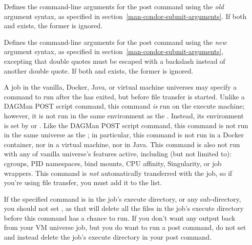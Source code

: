 \begin{description}
\item[\AdAttr{PostArgs}:] Defines the command-line arguments for the
post command using the \emph{old} argument syntax, as specified in
section~\ref{man-condor-submit-arguments}. If both 
and  exists, the former is ignored.

\item[\AdAttr{PostArguments}:] Defines the command-line arguments for the
post command using the \emph{new} argument syntax, as specified in
section~\ref{man-condor-submit-arguments}, excepting that double quotes must
be escaped with a backslash instead of another double quote. If both
 and  exists, the former is ignored.

\label{PostCmd}
\item[\AdAttr{PostCmd}:] A job in the vanilla, Docker, Java, or virtual machine
universes may specify a command to run after the  has
exited, but before file transfer is started.  Unlike a DAGMan POST script
command, this command \emph{is} run on the execute machine; however, it
is not run in the same environment as the .  Instead,
its environment is set by  or .  Like
the DAGMan POST script command, this command is not run in the same universe
as the ; in particular, this command is not run in a
Docker container, nor in a virtual machine, nor in Java.  This command is
also not run with any of vanilla universe's features active, including (but
not limited to): cgroups, PID namespaces, bind mounts, CPU affinity,
Singularity, or job wrappers. This command is \emph{not}
automatically transferred with the job, so if you're using file transfer,
you must add it to the  list.

If the specified command is in the job's execute directory, or any
sub-directory, you should not set , as that
will delete all the files in the job's execute directory before this
command has a chance to run.  If you don't want any output back from
your VM universe job, but you do want to run a post command, do not
set  and instead delete the job's execute
directory in your post command.


\end{description}
